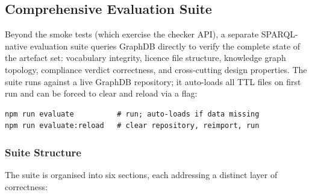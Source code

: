 \documentclass[12pt,a4paper]{article}
\begin{document}
\subsection{Comprehensive Evaluation Suite}
\label{sec:eval}

Beyond the smoke tests (which exercise the checker API), a separate SPARQL-native evaluation suite queries GraphDB directly to verify the complete state of the artefact set: vocabulary integrity, licence file structure, knowledge graph topology, compliance verdict correctness, and cross-cutting design properties. The suite runs against a live GraphDB repository; it auto-loads all TTL files on first run and can be forced to clear and reload via a flag:

\begin{lstlisting}[language={}]
npm run evaluate          # run; auto-loads if data missing
npm run evaluate:reload   # clear repository, reimport, run
\end{lstlisting}

\subsubsection*{Suite Structure}

The suite is organised into six sections, each addressing a distinct layer of correctness:
\end{document}
